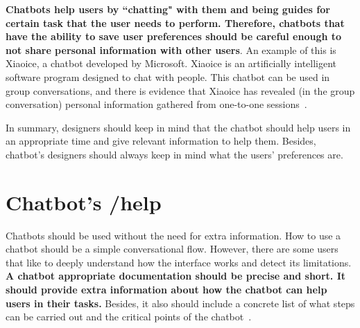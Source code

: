 \documentclass[a4paper,10pt]{article}
\begin{document}
\textbf{Chatbots help users by ``chatting" with them and being guides for certain task that the user needs to perform. Therefore, chatbots that have the ability to save user preferences should be careful enough to not share personal information with other users}. An example of this is Xiaoice, a chatbot developed by Microsoft. Xiaoice is an artificially intelligent software program designed to chat with people. This chatbot can be used in group conversations, and there is evidence that Xiaoice has revealed (in the group conversation) personal information gathered from one-to-one sessions~\cite{TheChallengeOfDesigningAChatbotWithManners}.     

In summary, designers should keep in mind that the chatbot should help users in an appropriate time and give relevant information to help them. Besides, chatbot's designers should always keep in mind what the users' preferences are. 


   




\section{Chatbot's /help}

Chatbots should be used without the need for extra information. How to use a chatbot should be a simple conversational flow. However, there are some users that like to deeply understand how the interface works and detect its limitations. \textbf{A chatbot appropriate documentation should be precise and short. It should provide extra information about how the chatbot can help users in their tasks.} Besides, it also should include a concrete list of what steps can be carried out and the critical points of the chatbot~\cite{HeuristicsWebPage}. 
\end{document}
